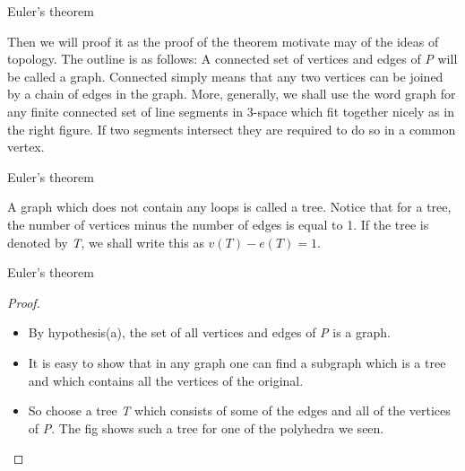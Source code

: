 \documentclass{beamer}
\begin{document}
\begin{frame}{Euler's theorem}
  \begin{definition}[Graph]
    Then we will proof it as the proof of the theorem motivate may of the ideas of topology. The outline is as follows: A connected set of vertices and edges of \textsl{P} will be called a graph. Connected simply means that any two vertices can be joined by a chain of edges in the graph. More, generally, we shall use the word graph for any finite connected set of line segments in 3-space which fit together nicely as in the right figure. If two segments intersect they are required to do so in a common vertex.
  \end{definition}
\end{frame}

\begin{frame}{Euler's theorem}
  \begin{definition}[Tree]
    A graph which does not contain any loops is called a tree. Notice that for a tree, the number of vertices minus the number of edges is equal to 1. If the tree is denoted by \textsl{T}, we shall write this as $v(T) - e(T) = 1$.
  \end{definition}
\end{frame}

\begin{frame}{Euler's theorem}
  \begin{proof}
    \begin{itemize}
    \item By hypothesis(a), the set of all vertices and edges of \textsl{P} is a graph.
    \item It is easy to show that in any graph one can find a subgraph which is a tree and which contains all the vertices of the original.
    \item So choose a tree \textsl{T} which consists of some of the edges and all of the vertices of \textsl{P}. The fig shows such a tree for one of the polyhedra we seen.
    \end{itemize}
  \end{proof}
\end{frame}
\end{document}
